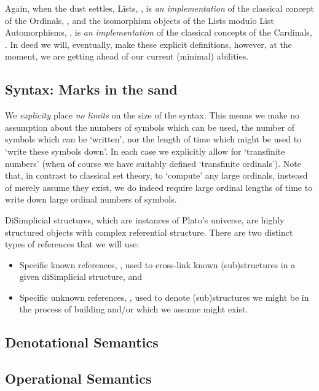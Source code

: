 \documentclass[a4paper,openany]{amsbook}
\begin{document}
Again, when the dust settles, Lists, \Lists, is \emph{an} \emph{implementation}
of the classical concept of the Ordinals, \Ordinal, and the isomorphism objects
of the Lists modulo List Automorphisms, \ListAutomorphisms, is \emph{an}
\emph{implementation} of the classical concepts of the Cardinals, \Cardinal. In
deed we will, eventually, make these explicit definitions, however, at the
moment, we are getting ahead of our current (minimal) abilities.

\subsection{Syntax: Marks in the sand}

We \emph{explicity} place \emph{no limits} on the size of the syntax. This means
we make no assumption about the numbers of symbols which can be used, the number
of symbols which can be `written', nor the length of time which might be used to
`write these symbols down'. In each case we explicitly allow for `transfinite
numbers' (when of course we have suitably defined `transfinite ordinals'). Note
that, in contrast to classical set theory, to `compute' any large ordinals,
insteasd of merely assume they exist, we do indeed require large ordinal lengths
of time to write down large ordinal numbers of symbols.

DiSimplicial structures, which are instances of Plato's universe, are highly
structured objects with complex referential structure. There are two
distinct types of references that we will use: 
%
\begin{itemize}
%
\item Specific known references, , used to cross-link known
(sub)structures in a given diSimplicial structure, and 
%
\item Specific unknown references, , used to denote
(sub)structures we might be in the process of building and/or which we assume
might exist. 
%
\end{itemize}
%


\subsection{Denotational Semantics}

\subsection{Operational Semantics}
\end{document}
